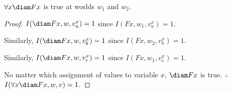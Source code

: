 \begin{claim}
$\forall x \diam Fx$ is true at worlds $w_1$ and $w_2$.
\end{claim}

\begin{proof}
$I(\diam Fx, w, v^x_a) = 1$ since $I(Fx, w_1, v^x_a) = 1$.

Similarly, $I(\diam Fx, w, v^x_b) = 1$ since $I(Fx, w_2, v^x_b) = 1$.

Similarly, $I(\diam Fx, w, v^x_c) = 1$ since $I(Fx, w_1, v^x_c) = 1$.

No matter which assignment of values to variable $x$, $\diam Fx$ is true. $\therefore$ $I(\forall x \diam Fx, w, v) = 1$.
\end{proof}
